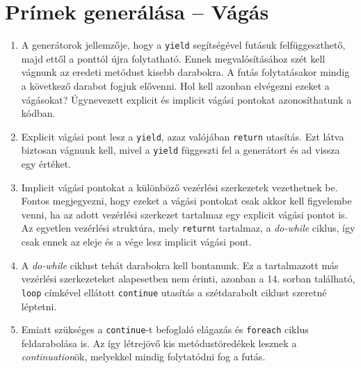 \documentclass[12pt, a4paper]{article}
\begin{document}
\section{Prímek generálása -- Vágás}

\begin{enumerate}
   \item
   A generátorok jellemzője, hogy a \texttt{yield} segítségével futásuk felfüggeszthető, majd ettől a ponttól újra folytatható. Ennek megvalósításához szét kell vágnunk az eredeti metódust kisebb darabokra. A futás folytatásakor mindig a következő darabot fogjuk elővenni. Hol kell azonban elvégezni ezeket a vágásokat? Úgynevezett explicit és implicit vágási pontokat azonosíthatunk a kódban.
   \item
   Explicit vágási pont lesz a \texttt{yield}, azaz valójában \texttt{return} utasítás. Ezt látva biztosan vágnunk kell, mivel a \texttt{yield} függeszti fel a generátort és ad vissza egy értéket.
   \item
   Implicit vágási pontokat a különböző vezérlési szerkezetek vezethetnek be. Fontos megjegyezni, hogy ezeket a vágási pontokat csak akkor kell figyelembe venni, ha az adott vezérlési szerkezet tartalmaz egy explicit vágási pontot is. Az egyetlen vezérlési struktúra, mely \texttt{return}t tartalmaz, a \textit{do-while} ciklus, így csak ennek az eleje és a vége lesz implicit vágási pont.
   \item
   A \textit{do-while} ciklust tehát darabokra kell bontanunk. Ez a tartalmazott más vezérlési szerkezeteket alapesetben nem érinti, azonban a 14. sorban található, \texttt{loop} címkével ellátott \texttt{continue} utasítás a szétdarabolt ciklust szeretné léptetni.
   \item
   Emiatt szükséges a \texttt{continue}-t befoglaló elágazás és \texttt{foreach} ciklus feldarabolása is. Az így létrejövő kis metódustöredékek lesznek a \textit{continuation}ök, melyekkel mindig folytatódni fog a futás.
\end{enumerate}
\end{document}
